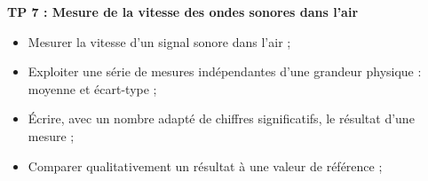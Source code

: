 \modeCorrection

\renewcommand{\thesection}{\textcolor{red}{Partie \Roman{section} -}}
\renewcommand{\thesubsection}{\textcolor{red}{\Roman{section}.\arabic{subsection}}}
\renewcommand{\thesubsubsection}{\textcolor{red}{\Roman{section}.\arabic{subsection}.\alph{subsubsection}}}

\setcounter{section}{0}
\setcounter{document}{0}
\sndEnTeteTPSept

\begin{center}
\begin{mdframed}[style=titr, leftmargin=60pt, rightmargin=60pt, innertopmargin=7pt, innerbottommargin=7pt, innerrightmargin=8pt, innerleftmargin=8pt]

\begin{center}
\large{\textbf{TP 7 : Mesure de la vitesse des ondes sonores dans l'air
}}
\end{center}
\end{mdframed}
\end{center}



\begin{tcolorbox}[colback=blue!5!white,colframe=blue!75!black,title=Objectifs de la séance :]
\begin{itemize}
    \item Mesurer la vitesse d’un signal sonore dans l'air ;
    \item Exploiter une série de mesures indépendantes d’une grandeur physique : moyenne et écart-type ;
    \item Écrire, avec un nombre adapté de chiffres significatifs, le résultat d’une mesure ;
    \item Comparer qualitativement un résultat à une valeur de référence ;
\end{itemize}
\end{tcolorbox}

